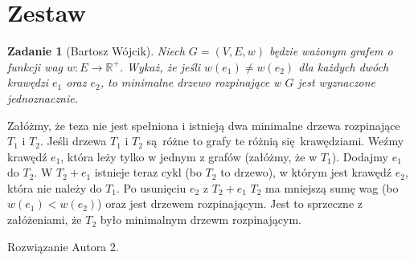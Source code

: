 \documentclass{mwart}
\newcommand{\R}{\mathbb{R}}
\newtheorem{zad}{Zadanie}[section]
\begin{document}
\section{Zestaw}          %
\begin{zad} [Bartosz Wójcik]
    Niech $G = (V, E, w)$ będzie ważonym grafem o funkcji wag $w: E \rightarrow \R^+$.
    Wykaż, że jeśli $w(e_1) \neq w(e_2)$ dla każdych dwóch krawędzi $e_1$ oraz $e_2$, to 
    minimalne drzewo rozpinające w $G$ jest wyznaczone jednoznacznie.
\end{zad}
\begin{mdframed}
    Załóżmy, że teza nie jest spełniona i istnieją dwa minimalne drzewa rozpinające $T_1$ i 
    $T_2$. Jeśli drzewa $T_1$ i $T_2$ są różne to grafy te różnią się krawędziami. Weźmy krawędź 
    $e_1$, która leży tylko w jednym z grafów (załóżmy, że w $T_1$). Dodajmy $e_1$ do $T_2$. W $T_2 + e_1$ 
     istnieje teraz cykl (bo $T_2$ to drzewo), w którym jest krawędź $e_2$, która nie należy do $T_1$. Po usunięciu 
     $e_2$ z $T_2 + e_1$ $T_2$ ma mniejszą sumę wag (bo $w(e_1) < w(e_2)$) oraz jest drzewem rozpinającym. Jest to sprzeczne 
     z załóżeniami, że $T_2$ było minimalnym drzewm rozpinającym.
\end{mdframed}
\begin{mdframed}
    Rozwiązanie Autora 2.
\end{mdframed}
\end{document}
